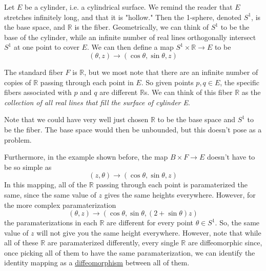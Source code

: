 \documentclass{article}
\newcounter{example}[section]
\begin{document}
  \begin{example}
    \label{ex:the-cylinder-as-a-trivial-bundle}
  Let $E$ be a cylinder, i.e. a cylindrical surface. We remind the reader that $E$ stretches infinitely long, and that it is "hollow." Then the 1-sphere, denoted $S^1$, is the base space, and $\mathbb{R}$ is the fiber. Geometrically, we can think of $S^1$ to be the base of the cylinder, while an infinite number of real lines orthogonally intersect $S^1$ at one point to cover $E$. We can then define a map $ S^1 \times \mathbb{R} \to E$ to be 
  \begin{equation}
    (\theta, z) \to (\cos{\theta}, \sin{\theta}, z)
  \end{equation}
  \end{example}

  The standard fiber $F$ is $\mathbb{R}$, but we most note that there are an infinite number of copies of $\mathbb{R}$ passing through each point in $E$. So given points $p, q \in E$, the specific fibers associated with $p$ and $q$ are different $\mathbb{R}$s. We can think of this fiber $\mathbb{R}$ as the \textit{collection of all real lines that fill the surface of cylinder E}. 

  Note that we could have very well just chosen $\mathbb{R}$ to be the base space and $S^1$ to be the fiber. The base space would then be unbounded, but this doesn't pose as a problem. 

  Furthermore, in the example shown before, the map $B \times F \to E$ doesn't have to be so simple as 
  \begin{equation}
    (z, \theta) \to (\cos{\theta}, \sin{\theta}, z)
  \end{equation}
  In this mapping, all of the $\mathbb{R}$ passing through each point is paramaterized the same, since the same value of $z$ gives the same heights everywhere. However, for the more complex paramaterization
  \begin{equation}
    (\theta, z) \to (\cos{\theta}, \sin{\theta}, (2 + \sin{\theta}) z)
  \end{equation}
  the paramaterizations in each $\mathbb{R}$ are different for every point $\theta \in S^1$. So, the same value of $z$ will not give you the same height everywhere. However, note that while all of these $\mathbb{R}$ are paramaterized differently, every single $\mathbb{R}$ are diffeomorphic since, once picking all of them to have the same paramaterization, we can identify the identity mapping as a \hyperref[def:diffeomorphism-2]{diffeomorphism} between all of them. 
\end{document}
